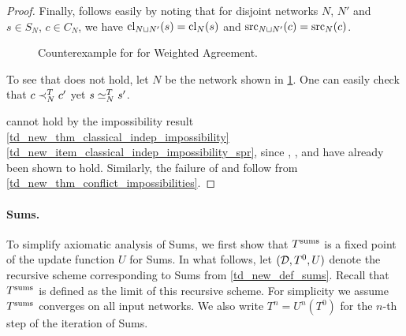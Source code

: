 \begin{proof}
    Finally, \disjointindependence{} follows easily by noting that for disjoint
    networks $N$, $N'$ and $s \in S_N$, $c \in C_N$, we have $\operatorname{cl}_{N \sqcup
    N'}(s) = \operatorname{cl}_N(s)$ and $\operatorname{src}_{N \sqcup N'}(c) = \operatorname{src}_N(c)$.

    \begin{figure}
        \centering
        \caption{
            Counterexample for \sourcecoherence{} for Weighted Agreement.
        }
        \label{td_new_fig_weighted_agreement_sourcecoh_counterex}
    \end{figure}

    To see that \sourcecoherence{} does not hold, let $N$ be the network shown
    in \cref{td_new_fig_weighted_agreement_sourcecoh_counterex}. One can easily
    check that $c \prec_N^T c'$ yet $s \simeq_N^T s'$.

    \classicalindependence{} cannot hold by the impossibility result
    \cref{td_new_thm_classical_indep_impossibility}
    \cref{td_new_item_classical_indep_impossibility_spr}, since \symmetry{},
    \claimcoherence{}, \freshposresp{} and \sourceposresp{} have already been
    shown to hold. Similarly, the failure of \conflictcoherence{} and
    \anticoherence{} follow from \cref{td_new_thm_conflict_impossibilities}.
\end{proof}

\paragraph{Sums.}

To simplify axiomatic analysis of Sums, we first show that $T^{\operatorname{sums}}$ is a fixed
point of the update function $U$ for Sums. In what follows, let $(\mathcal{D}, T^0, U)$
denote the recursive scheme corresponding to Sums from \cref{td_new_def_sums}.
Recall that $T^{\operatorname{sums}}$ is defined as the limit of this recursive scheme. For
simplicity we assume $T^{\operatorname{sums}}$ converges on all input networks.\footnotemark{} We
also write $T^n = U^n(T^0)$ for the $n$-th step of the iteration of Sums.


